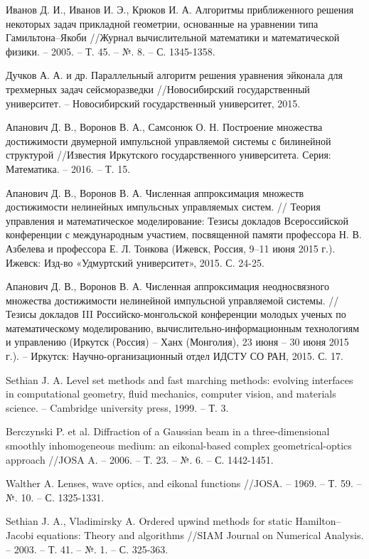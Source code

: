 \begin{thebibliography}{99}
 Иванов Д. И., Иванов И. Э., Крюков И. А. Алгоритмы
  приближенного решения некоторых задач прикладной геометрии,
  основанные на уравнении типа Гамильтона–Якоби //Журнал
  вычислительной математики и математической физики. – 2005. –
  Т. 45. – №. 8. – С. 1345-1358.

 Дучков А. А. и др. Параллельный алгоритм решения
  уравнения эйконала для трехмерных задач сейсморазведки
  //Новосибирский государственный университет. – Новосибирский
  государственный университет, 2015.
  
 Апанович Д. В., Воронов В. А., Самсонюк
  О. Н. Построение множества достижимости двумерной импульсной
  управляемой системы с билинейной структурой //Известия Иркутского
  государственного университета. Серия: Математика. – 2016. – Т. 15.

 Апанович Д. В., Воронов В. А. Численная аппроксимация
  множеств достижимости нелинейных импульсных управляемых систем. //
  Теория управления и математическое моделирование: Тезисы докладов
  Всероссийской конференции с международным участием, посвященной
  памяти профессора Н. В. Азбелева и профессора Е. Л. Тонкова (Ижевск,
  Россия, 9–11 июня 2015 г.). Ижевск: Изд-во «Удмуртский университет»,
  2015. С. 24-25.

 Апанович Д. В., Воронов В. А. Численная
  аппроксимация неодносвязного множества достижимости нелинейной
  импульсной управляемой системы. // Тезисы докладов III
  Российско-монгольской конференции молодых ученых по математическому
  моделированию, вычислительно-информационным технологиям и управлению
  (Иркутск (Россия) – Ханх (Монголия), 23 июня – 30 июня 2015 г.). –
  Иркутск: Научно-организационный отдел ИДСТУ СО РАН, 2015. С. 17.
  
 Sethian J. A. Level set methods and fast marching
  methods: evolving interfaces in computational geometry, fluid
  mechanics, computer vision, and materials science. – Cambridge
  university press, 1999. – Т. 3.

Berczynski P. et al. Diffraction of a Gaussian beam in
  a three-dimensional smoothly inhomogeneous medium: an eikonal-based
  complex geometrical-optics approach //JOSA A. – 2006. – Т. 23. –
  №. 6. – С. 1442-1451.

 Walther A. Lenses, wave optics, and eikonal functions
  //JOSA. – 1969. – Т. 59. – №. 10. – С. 1325-1331.
  
 Sethian J. A., Vladimirsky A. Ordered upwind methods
  for static Hamilton--Jacobi equations: Theory and algorithms //SIAM
  Journal on Numerical Analysis. – 2003. – Т. 41. – №. 1. –
  С. 325-363.
  

\end{thebibliography}
